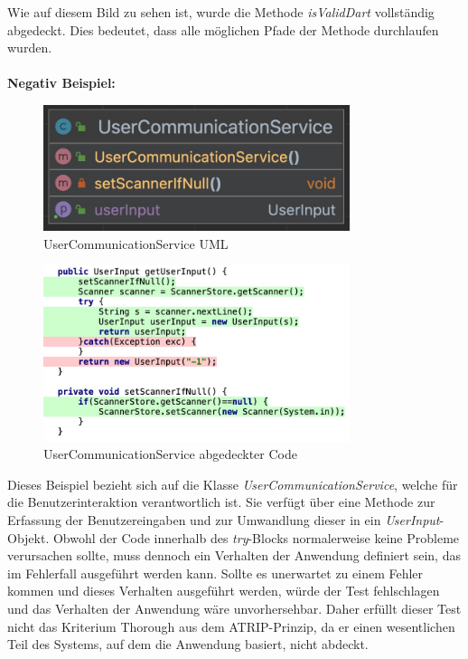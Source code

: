 Wie auf diesem Bild zu sehen ist, wurde die Methode \textit{isValidDart} vollständig abgedeckt. Dies bedeutet, dass alle möglichen Pfade der Methode durchlaufen wurden.\\\\
\textbf{Negativ Beispiel:}\\
\begin{figure}[ht]
    \centering
    \includegraphics[width=0.8\textwidth]{Bilder/UserCommunicationServiceUML.png}
    \caption{UserCommunicationService UML}
    \label{fig:usercommunicationservice-uml}
\end{figure}
\newpage
\begin{figure}[ht]
    \centering
    \includegraphics[width=0.8\textwidth]{Bilder/UserCommunicationService-Thorough.png}
    \caption{UserCommunicationService abgedeckter Code}
    \label{fig:usercommunicationservice-abgedeckter-code}
\end{figure}
Dieses Beispiel bezieht sich auf die Klasse \textit{UserCommunicationService}, welche für die Benutzerinteraktion verantwortlich ist. Sie verfügt über eine Methode zur Erfassung der Benutzereingaben und zur Umwandlung dieser in ein \textit{UserInput}-Objekt. Obwohl der Code innerhalb des \textit{try}-Blocks normalerweise keine Probleme verursachen sollte, muss dennoch ein Verhalten der Anwendung definiert sein, das im Fehlerfall ausgeführt werden kann. Sollte es unerwartet zu einem Fehler kommen und dieses Verhalten ausgeführt werden, würde der Test fehlschlagen und das Verhalten der Anwendung wäre unvorhersehbar. Daher erfüllt dieser Test nicht das Kriterium Thorough aus dem ATRIP-Prinzip, da er einen wesentlichen Teil des Systems, auf dem die Anwendung basiert, nicht abdeckt.
